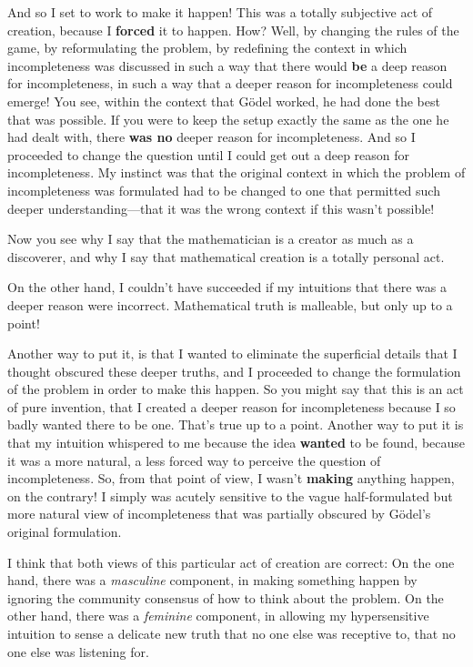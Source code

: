 \documentclass[12pt]{book}
\begin{document}
And so I set to work to make it happen! This was a totally subjective act of creation, because
I \textbf{forced} it to happen. How?  Well, by changing the rules of the game, 
by reformulating the problem,
by redefining the context in which incompleteness was discussed in such a way that there would
\textbf{be} a deep reason for incompleteness, in such a way that a deeper reason for incompleteness
could emerge! You see, within the context that G\"odel
worked, he had done the best that was possible.  If you were to keep the setup exactly the
same as the one he had dealt with, there \textbf{was no} deeper reason for incompleteness.  And so
I proceeded to change the question until I could get out a deep reason for incompleteness.
My instinct was that the original context in which the problem of incompleteness was formulated
had to be changed to one that permitted such deeper understanding---that it was the wrong context
if this wasn't possible!

Now you see why I say that the mathematician is a creator as much as a discoverer, and why I
say that mathematical creation is a totally personal act.  

On the other hand, I couldn't have
succeeded if my intuitions that there was a deeper reason were incorrect. 
Mathematical truth is malleable, but only up to a point!

Another way to put it, is that I wanted to eliminate the superficial details that I thought
obscured these deeper truths, and I proceeded to change the formulation of the problem in order
to make this happen.  So you might say that this is an act of pure invention, that I created
a deeper reason for incompleteness because I so badly wanted there to be one.  That's true up
to a point. Another way to put it is that my intuition whispered to me because the idea \textbf{wanted}
to be found, because it was a more natural, a less forced way to perceive the question of 
incompleteness.  So, from that point of view, I wasn't \textbf{making} anything happen, on the contrary!
I simply was acutely sensitive to the vague half-formulated but more natural view of incompleteness
that was partially obscured by G\"odel's original formulation.

I think that both views of this 
particular
act of creation are correct: On the one hand, there was a \emph{masculine}
component, in making something happen by ignoring the community consensus of how to think about
the problem. On the other hand, there was a \emph{feminine} component, in allowing my hypersensitive
intuition to sense a delicate new truth that no one else was receptive to, that no one else was
listening for.
\end{document}

